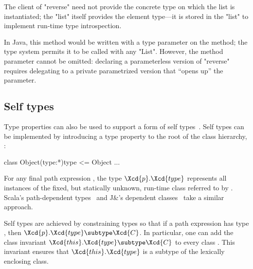 \noindent
The client of \xcd"reverse" need not provide the concrete type
on which the list is instantiated; the \xcd"list" itself
provides the element type---it is stored in the \xcd"list"
to implement run-time type introspection.

In Java, this method would be written with a type parameter on
the method; the type system permits it to be called with any
\xcd"List".
However,
the method parameter cannot be omitted: declaring a parameterless version
of \xcd"reverse" requires delegating to a private parametrized version that
``opens up'' the parameter.

%


\subsection{Self types}

Type properties can also be used to support a form of self
types~\cite{bruce-binary,bsg95}.
%
Self types can be implemented by introducing a
type property  to the root of the class hierarchy, :
\begin{xtenmath}
class Object(type:*){type <= Object} { $\dots$ }
\end{xtenmath}

\noindent
For any final path expression , the type
$\Xcd{p}.\Xcd{type}$ represents all instances of the fixed,
but statically unknown, run-time class referred to by .
Scala's path-dependent types~\cite{scala} and J\&'s
dependent classes~\cite{nqm06}
take a similar approach.

Self types are achieved by
constraining types so that if a path expression 
has type , then
$\Xcd{p}.\Xcd{type} \subtype \Xcd{C}$.
In particular, one can add the class invariant
$\Xcd{this}.\Xcd{type} \subtype \Xcd{C}$ to every class .
This invariant ensures that
$\Xcd{this}.\Xcd{type}$ is a subtype
of the lexically enclosing class.

